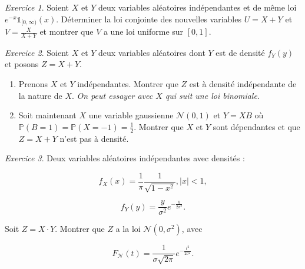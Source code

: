 \documentclass[french]{book}
\theoremstyle{definition}
\theoremstyle{remark}
\newtheorem{exo}{Exercice}
\newcommand{\lesss}{<}
\newcommand{\less}{\lesss}
\begin{document}
\begin{exo}
  Soient \(X\) et \(Y\) deux variables aléatoires indépendantes et de même loi \(e^{-x}\mathds{1}_{[0, \infty)}(x)\). Déterminer la loi conjointe des nouvelles variables \(U = X+Y\) et \(V = \displaystyle\frac{X}{X+Y}\) et montrer que \(V\) a une loi uniforme sur \([0,1]\).
\end{exo}

\begin{exo}
  Soient \(X\) et \(Y\) deux variables aléatoires dont \(Y\) est de densité \(f _{Y}(y)\) et posons \(Z = X+Y\).

  \begin{enumerate}
    \item Prenons \(X\) et \(Y\) indépendantes. Montrer que \(Z\) est à densité indépendante de la nature de \(X\). \emph{On peut essayer avec \(X\) qui suit une loi binomiale}.
    \item Soit maintenant \(X\) une variable gaussienne \(\mathscr{N}(0, 1)\) et \(Y=XB\) où \(\mathbb{P}(B=1) = \mathbb{P}(X=-1) = \frac{1}{2}\). Montrer que \(X\) et \(Y\) sont dépendantes et que \(Z = X+Y\) n'est pas à densité.
  \end{enumerate}
\end{exo}

\begin{exo}
  Deux variables aléatoires indépendantes avec densités :

  \[f_X(x) = \frac{1}{\pi} \frac{1}{\sqrt{ 1- x ^2 }}, \left\lvert x \right\rvert \less 1,\]

  \[f_Y(y) = \frac{y}{\sigma ^2}e^{- \frac{y}{2 \sigma ^2}}.\]


  Soit \(Z = X \cdot Y\). Montrer que \(Z\) a la loi \(\mathscr{N}(0, \sigma^2)\), avec

  \[F _{\mathscr{N}}(t) = \frac{1}{\sigma \sqrt{ 2 \pi } } e^{-\frac{t ^2}{2 \sigma ^2}}.\]
\end{exo}
\end{document}
